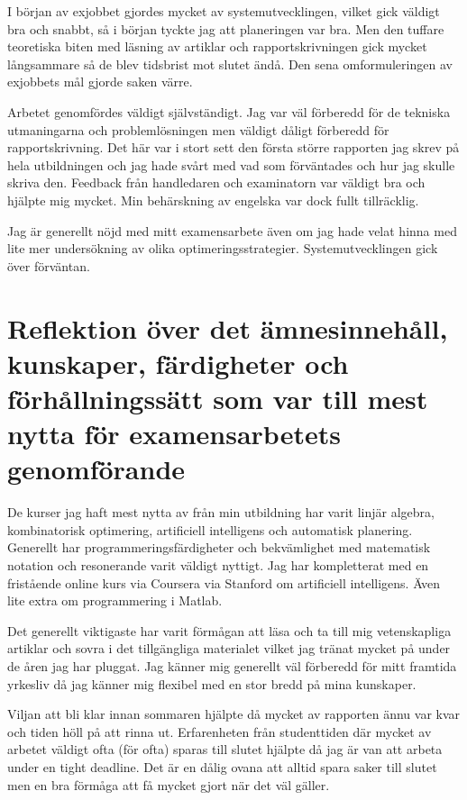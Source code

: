 \documentclass[11pt]{article}
\begin{document}
I början av exjobbet gjordes mycket av systemutvecklingen, vilket gick väldigt bra och snabbt, så i början tyckte jag att planeringen var bra. Men den tuffare teoretiska biten med läsning av artiklar och rapportskrivningen gick mycket långsammare så de blev tidsbrist mot slutet ändå. Den sena omformuleringen av exjobbets mål gjorde saken värre.

Arbetet genomfördes väldigt självständigt. Jag var väl förberedd för de tekniska utmaningarna och problemlösningen men väldigt dåligt förberedd för rapportskrivning. Det här var i stort sett den första större rapporten jag skrev på hela utbildningen och jag hade svårt med vad som förväntades och hur jag skulle skriva den. Feedback från handledaren och examinatorn var väldigt bra och hjälpte mig mycket.  Min behärskning av engelska var dock fullt tillräcklig.

Jag är generellt nöjd med mitt examensarbete även om jag hade velat hinna med lite mer undersökning av olika optimeringsstrategier. Systemutvecklingen gick över förväntan.



\section*{Reflektion över det ämnesinnehåll, kunskaper, färdigheter och förhållningssätt som var till mest nytta för examensarbetets genomförande}


De kurser jag haft mest nytta av från min utbildning har varit linjär algebra, kombinatorisk optimering, artificiell intelligens och automatisk planering. Generellt har programmeringsfärdigheter och bekvämlighet med matematisk notation och resonerande varit väldigt nyttigt. Jag har kompletterat med en fristående online kurs via Coursera via Stanford om artificiell intelligens. Även lite extra om programmering i Matlab.

Det generellt viktigaste har varit förmågan att läsa och ta till mig vetenskapliga artiklar och sovra i det tillgängliga materialet vilket jag tränat mycket på under de åren jag har pluggat. Jag känner mig generellt väl förberedd för mitt framtida yrkesliv då jag känner mig flexibel med en stor bredd på mina kunskaper.

Viljan att bli klar innan sommaren hjälpte då mycket av rapporten ännu var kvar och tiden höll på att rinna ut. Erfarenheten från studenttiden där mycket av arbetet väldigt ofta (för ofta) sparas till slutet hjälpte då jag är van att arbeta under en tight deadline. Det är en dålig ovana att alltid spara saker till slutet men en bra förmåga att få mycket gjort när det väl gäller.
\end{document}
